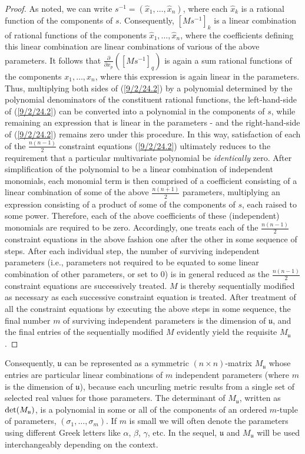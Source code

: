 \documentclass{amsart}
\theoremstyle{definition}
\numberwithin{theorem}{section}
\numberwithin{equation}{section}
\begin{document}
\begin{proof}
As noted, we can write $s^{-1} = (\hat{x}_1,\dots,\hat{x}_n)$, where each $\hat{x}_k$ is a rational function of the components of $s$.  Consequently, $[Ms^{-1}]_k$ is a linear combination of rational functions of the components $\hat{x}_1,\dots,\hat{x}_n$, where the coefficients defining this linear combination are linear combinations of various of the above parameters.  It follows that $\frac{\partial}{\partial x_p}([Ms^{-1}]_q)$ is again a sum rational functions of the components $x_1,\dots,x_n$, where this expression is again linear in the parameters.  Thus, multiplying both sides of (\ref{9/2/24.2}) by a polynomial determined by the polynomial denominators of the constituent rational functions, the left-hand-side of (\ref{9/2/24.2}) can be converted into a polynomial in the components of $s$, while remaining an expression that is linear in the parameters - and the right-hand-side of (\ref{9/2/24.2}) remains zero under this procedure.
In this way, satisfaction of each of the $\frac{n(n-1)}{2}$ constraint equations (\ref{9/2/24.2}) ultimately reduces to the requirement that a particular multivariate polynomial be {\it identically} zero.  After simplification of the polynomial to be a linear combination of independent monomials, each monomial term is then comprised of a coefficient consisting of a linear combination of some of the above $\frac{n(n+1)}{2}$ parameters, multiplying an expression consisting of a product of some of the components of $s$, each raised to some power.  Therefore, each of the above coefficients of these (independent) monomials are required to be zero.  Accordingly, one treats each of the $\frac{n(n-1)}{2}$ constraint equations in the above fashion one after the other in some sequence of steps.  After each individual step, the number of surviving independent parameters (i.e., parameters not required to be equated to some linear combination of other parameters, or set to 0) is in general reduced as the $\frac{n(n-1)}{2}$ constraint equations are successively treated.  $M$ is thereby sequentially modified as necessary as each successive constraint equation is treated.  After treatment of all the constraint equations by executing the above steps in some sequence, the final number $m$ of surviving independent parameters is the dimension of $\mathfrak{u}$, and the final entries of the sequentially modified $M$ evidently yield the requisite $M_\mathfrak{u}$.
\end{proof}


Consequently, $\mathfrak{u}$ can be represented as a symmetric $(n\times n)$-matrix $M_{\mathfrak{u}}$ whose entries are particular linear combinations of $m$ independent parameters (where $m$ is the dimension of $\mathfrak{u}$), because each uncurling metric results from a single set of selected real values for those parameters.  The determinant of $M_{\mathfrak{u}}$, written as ${\rm det}(M_{\mathfrak{u}})$, is a polynomial in some or all of the components of an ordered $m$-tuple of parameters, $(\sigma_1,\dots,\sigma_m)$.  If $m$ is small  we will often denote the parameters using different Greek letters like $\alpha$, $\beta $, $\gamma$, etc. In the sequel, $\mathfrak{u}$ and $M_{\mathfrak{u}}$ will be used interchangeably depending on the context.
\end{document}
